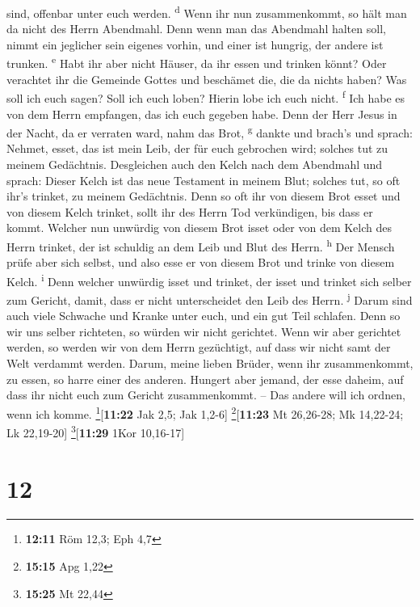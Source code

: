 sind, offenbar unter euch werden. \textsuperscript{d} 
Wenn ihr nun zusammenkommt, so hält man da nicht des Herrn Abendmahl.
 Denn wenn man das Abendmahl halten soll, nimmt ein
jeglicher sein eigenes vorhin, und einer ist hungrig, der andere ist
trunken. \textsuperscript{e}  Habt ihr aber nicht Häuser,
da ihr essen und trinken könnt? Oder verachtet ihr die Gemeinde Gottes
und beschämet die, die da nichts haben? Was soll ich euch sagen? Soll
ich euch loben? Hierin lobe ich euch nicht. \textsuperscript{f}
 Ich habe es von dem Herrn empfangen, das ich euch
gegeben habe. Denn der Herr Jesus in der Nacht, da er verraten ward,
nahm das Brot, \textsuperscript{g}  dankte und brach's
und sprach: Nehmet, esset, das ist mein Leib, der für euch gebrochen
wird; solches tut zu meinem Gedächtnis.  Desgleichen auch
den Kelch nach dem Abendmahl und sprach: Dieser Kelch ist das neue
Testament in meinem Blut; solches tut, so oft ihr's trinket, zu meinem
Gedächtnis.  Denn so oft ihr von diesem Brot esset und
von diesem Kelch trinket, sollt ihr des Herrn Tod verkündigen, bis dass
er kommt.  Welcher nun unwürdig von diesem Brot isset
oder von dem Kelch des Herrn trinket, der ist schuldig an dem Leib und
Blut des Herrn. \textsuperscript{h}  Der Mensch prüfe
aber sich selbst, und also esse er von diesem Brot und trinke von diesem
Kelch. \textsuperscript{i}  Denn welcher unwürdig isset
und trinket, der isset und trinket sich selber zum Gericht, damit, dass
er nicht unterscheidet den Leib des Herrn. \textsuperscript{j}
 Darum sind auch viele Schwache und Kranke unter euch,
und ein gut Teil schlafen.  Denn so wir uns selber
richteten, so würden wir nicht gerichtet.  Wenn wir aber
gerichtet werden, so werden wir von dem Herrn gezüchtigt, auf dass wir
nicht samt der Welt verdammt werden.  Darum, meine lieben
Brüder, wenn ihr zusammenkommt, zu essen, so harre einer des anderen.
 Hungert aber jemand, der esse daheim, auf dass ihr nicht
euch zum Gericht zusammenkommt. -- Das andere will ich ordnen, wenn ich
komme. \footnote{\textbf{12:11} Röm 12,3; Eph 4,7}{[}\textbf{11:22} Jak
2,5; Jak 1,2-6{]} \footnote{\textbf{15:15} Apg 1,22}{[}\textbf{11:23} Mt
26,26-28; Mk 14,22-24; Lk 22,19-20{]} \footnote{\textbf{15:25} Mt 22,44}{[}\textbf{11:29}
1Kor 10,16-17{]}

\hypertarget{section-11}{%
\section{12}\label{section-11}}

